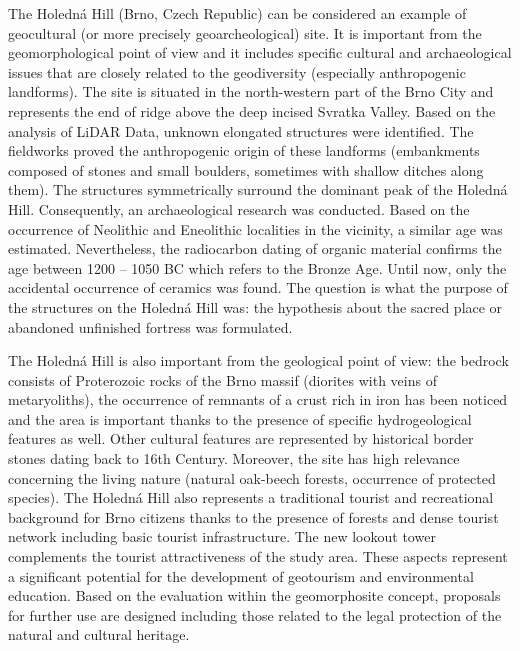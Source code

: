 {The Holedná Hill (Brno, Czech Republic) can be considered an example of geocultural (or more precisely geoarcheological) site. It is important from the geomorphological point of view and it includes specific cultural and archaeological issues that are closely related to the geodiversity (especially anthropogenic landforms). The site is situated in the north-western part of the Brno City and represents the end of ridge above the deep incised Svratka Valley. Based on the analysis of LiDAR Data, unknown elongated structures were identified. The fieldworks proved the anthropogenic origin of these landforms (embankments composed of stones and small boulders, sometimes with shallow ditches along them). The structures symmetrically surround the dominant peak of the Holedná Hill. Consequently, an archaeological research was conducted. Based on the occurrence of Neolithic and Eneolithic localities in the vicinity, a similar age was estimated. Nevertheless, the radiocarbon dating of organic material confirms the age between 1200 -- 1050 BC which refers to the Bronze Age. Until now, only the accidental occurrence of ceramics was found. The question is what the purpose of the structures on the Holedná Hill was: the hypothesis about the sacred place or abandoned unfinished fortress was formulated.
	
The Holedná Hill is also important from the geological point of view: the bedrock consists of Proterozoic rocks of the Brno massif (diorites with veins of metaryoliths), the occurrence of remnants of a crust rich in iron has been noticed and the area is important thanks to the presence of specific hydrogeological features as well. Other cultural features are represented by historical border stones dating back to 16th Century. Moreover, the site has high relevance concerning the living nature (natural oak-beech forests, occurrence of protected species). The Holedná Hill also represents a traditional tourist and recreational background for Brno citizens thanks to the presence of forests and dense tourist network including basic tourist infrastructure. The new lookout tower complements the tourist attractiveness of the study area. These aspects represent a significant potential for the development of geotourism and environmental education. Based on the evaluation within the geomorphosite concept, proposals for further use are designed including those related to the legal protection of the natural and cultural heritage.

}
